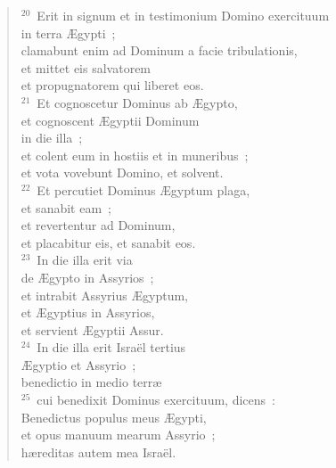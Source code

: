 \begin{flushleft}
\begin{verse}
${}^{20}$~Erit in signum et in testimonium Domino exercituum\\ in terra \AE gypti~;\\ clamabunt enim ad Dominum a facie tribulationis,\\ et mittet eis salvatorem\\ et propugnatorem qui liberet eos.\\
${}^{21}$~Et cognoscetur Dominus ab \AE gypto,\\ et cognoscent \AE gyptii Dominum\\ in die illa~;\\ et colent eum in hostiis et in muneribus~;\\ et vota vovebunt Domino, et solvent.\\
${}^{22}$~Et percutiet Dominus \AE gyptum plaga,\\ et sanabit eam~;\\ et revertentur ad Dominum,\\ et placabitur eis, et sanabit eos.\\
${}^{23}$~In die illa erit via\\ de \AE gypto in Assyrios~;\\ et intrabit Assyrius \AE gyptum,\\ et \AE gyptius in Assyrios,\\ et servient \AE gyptii Assur.\\
${}^{24}$~In die illa erit Isra\"el tertius\\ \AE gyptio et Assyrio~;\\ benedictio in medio terr\ae \\
${}^{25}$~cui benedixit Dominus exercituum, dicens~:\\ Benedictus populus meus \AE gypti,\\ et opus manuum mearum Assyrio~;\\ h\ae reditas autem mea Isra\"el.\end{verse}\end{flushleft}



